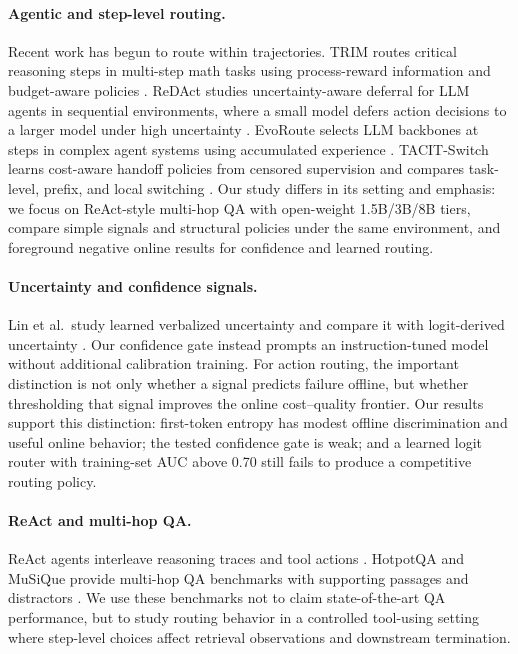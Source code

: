 \documentclass[sigplan,screen,review,anonymous,nonacm]{acmart}
\begin{document}
\paragraph{Agentic and step-level routing.}
Recent work has begun to route within trajectories. TRIM routes critical
reasoning steps in multi-step math tasks using process-reward information and
budget-aware policies \cite{trim}. ReDAct studies uncertainty-aware deferral
for LLM agents in sequential environments, where a small model defers action
decisions to a larger model under high uncertainty \cite{redact}. EvoRoute
selects LLM backbones at steps in complex agent systems using accumulated
experience \cite{evoroute}. TACIT-Switch learns cost-aware handoff policies
from censored supervision and compares task-level, prefix, and local switching
\cite{tacitswitch}. Our study differs in its setting and emphasis: we focus on
ReAct-style multi-hop QA with open-weight 1.5B/3B/8B tiers, compare simple
signals and structural policies under the same environment, and foreground
negative online results for confidence and learned routing.

\paragraph{Uncertainty and confidence signals.}
Lin et al.\ study learned verbalized uncertainty and compare it with
logit-derived uncertainty \cite{verbalized}. Our confidence gate instead
prompts an instruction-tuned model without additional calibration training. For action routing, the important distinction is not only
whether a signal predicts failure offline, but whether thresholding that signal
improves the online cost--quality frontier. Our results support this
distinction: first-token entropy has modest offline discrimination and useful
online behavior; the tested confidence gate is weak; and a learned logit router
with training-set AUC above 0.70 still fails to produce a competitive routing policy.

\paragraph{ReAct and multi-hop QA.}
ReAct agents interleave reasoning traces and tool actions
\cite{react}. HotpotQA and MuSiQue provide multi-hop QA benchmarks with
supporting passages and distractors \cite{hotpotqa,musique}. We use these
benchmarks not to claim state-of-the-art QA performance, but to study routing
behavior in a controlled tool-using setting where step-level choices affect
retrieval observations and downstream termination.
\end{document}
